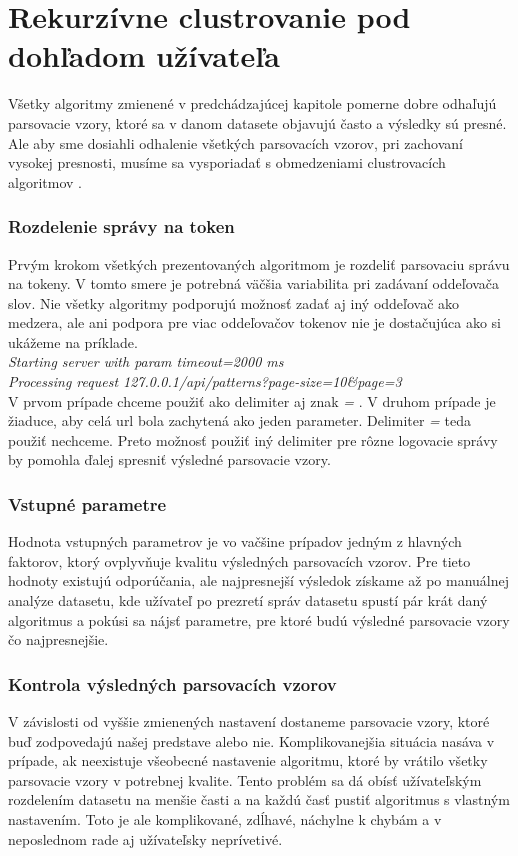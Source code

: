 \chapter{Rekurzívne clustrovanie pod dohľadom užívateľa}

Všetky algoritmy zmienené v predchádzajúcej kapitole pomerne dobre odhaľujú parsovacie vzory, ktoré sa v danom datasete objavujú často a výsledky sú presné. Ale aby sme dosiahli odhalenie všetkých parsovacích vzorov, pri zachovaní vysokej presnosti, musíme sa vysporiadať s obmedzeniami clustrovacích algoritmov \parencite{Tovarnak2017}.

\subsection*{Rozdelenie správy na token}
Prvým krokom všetkých prezentovaných algoritmom je rozdeliť parsovaciu správu na tokeny. V tomto smere je potrebná väčšia variabilita pri zadávaní oddeľovača slov. Nie všetky algoritmy podporujú možnosť zadať aj iný oddeľovač ako medzera, ale ani podpora pre viac oddeľovačov tokenov nie je dostačujúca ako si ukážeme na príklade. \\

\indent \emph{Starting server with param timeout=2000 ms} \\
\indent \emph{Processing request 127.0.0.1/api/patterns?page-size=10\&page=3} \\

V prvom prípade chceme použiť ako delimiter aj znak \emph{=} . V druhom prípade je žiaduce, aby celá url bola zachytená ako jeden parameter. Delimiter \emph{=} teda použiť nechceme. Preto možnosť použiť iný delimiter pre rôzne logovacie správy by pomohla ďalej spresniť výsledné parsovacie vzory.

\subsection*{Vstupné parametre}
Hodnota vstupných parametrov je vo vačšine prípadov jedným z hlavných faktorov, ktorý ovplyvňuje kvalitu výsledných parsovacích vzorov.
Pre tieto hodnoty existujú odporúčania, ale najpresnejší výsledok získame až po manuálnej analýze datasetu, kde užívateľ po prezretí správ datasetu spustí pár krát daný algoritmus a pokúsi sa nájsť parametre, pre ktoré budú výsledné parsovacie vzory čo najpresnejšie.

\subsection*{Kontrola výsledných parsovacích vzorov}
V závislosti od vyššie zmienených nastavení dostaneme parsovacie vzory, ktoré buď zodpovedajú našej predstave alebo nie. Komplikovanejšia situácia nasáva v prípade, ak neexistuje všeobecné nastavenie algoritmu, ktoré by vrátilo všetky parsovacie vzory v potrebnej kvalite. Tento problém sa dá obísť užívateľským rozdelením datasetu na menšie časti a na každú časť pustiť algoritmus s vlastným nastavením. Toto je ale komplikované, zdĺhavé, náchylne k chybám a v neposlednom rade aj užívateľsky neprívetivé.


